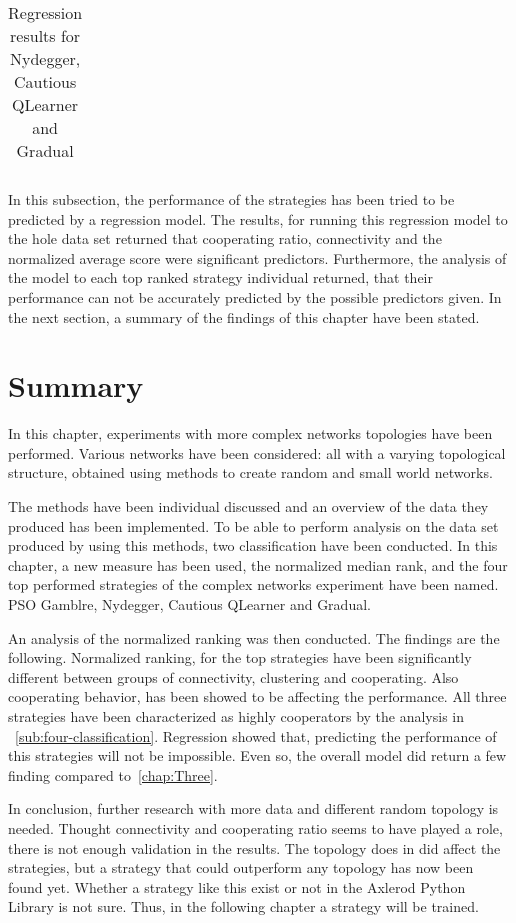 \begin{table}[!hbtp]
\begin{adjustbox}{width=0.7\textwidth}
\begin{tabular}{|l|l|l|l|l|l|l|l|l|l|}
		\end{tabular}
	\end{adjustbox}
	\caption{Regression results for Nydegger, Cautious QLearner and Gradual}
	\label{reg-for-top}
\end{table}

In this subsection, the performance of the strategies has been tried to be predicted
by a regression model. The results, for running this regression model to the
hole data set returned that cooperating ratio, connectivity and the normalized
average score were significant predictors. Furthermore, the analysis of the model
to each top ranked strategy individual returned, that their performance can not
be accurately predicted by the possible predictors given. In the next section,
a summary of the findings of this chapter have been stated.

\section{Summary}
In this chapter, experiments with more complex networks topologies have been
performed. Various networks have been considered: all with a varying topological
structure, obtained using methods to create random and small world networks.

The methods have been individual discussed and an overview of the data they
produced has been implemented. To be able to perform analysis on the data set
produced by using this methods, two classification have been conducted.
In this chapter, a new measure has been used, the normalized median rank,
and the four top performed strategies of the complex networks experiment have
been named. PSO Gamblre, Nydegger, Cautious QLearner and Gradual.

An analysis of the normalized ranking was then conducted. The findings are the
following. Normalized ranking, for the top strategies have been significantly different
between groups of connectivity, clustering and cooperating. Also cooperating behavior, has been showed to
be affecting the performance. All three strategies have been characterized as highly
cooperators by the analysis in ~\ref{sub:four-classification}. Regression showed that, predicting the
performance of this strategies will not be impossible. Even so, the overall model
did return a few finding compared to~\autoref{chap:Three}.

In conclusion, further research with more data and different random topology
is needed. Thought connectivity and cooperating ratio seems to have played a role,
there is not enough validation in the results. The topology does in did affect
the strategies, but a strategy that could outperform any topology has now been
found yet. Whether a strategy like this exist or not in the Axlerod Python Library
is not sure. Thus, in the following chapter a strategy will be trained.
